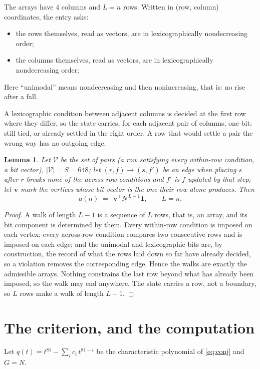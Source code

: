 \documentclass[11pt,a4paper]{article}
\theoremstyle{plain}
\newtheorem{lemma}[theorem]{Lemma}
\theoremstyle{definition}
\begin{document}
The arrays have $4$ columns and $L=n$ rows. Written in (row, column)
coordinates, the entry asks:
\begin{itemize}
\item the rows themselves, read as vectors, are in lexicographically nondecreasing order;
\item the columns themselves, read as vectors, are in lexicographically nondecreasing order;
\end{itemize}
Here ``unimodal'' means nondecreasing and then nonincreasing, that is: no rise after a fall.

A lexicographic condition between adjacent columns is decided
at the first row where they differ, so the state carries, for each adjacent pair of
columns, one bit: still tied, or already settled in the right order. A row that would
settle a pair the wrong way has no outgoing edge.

\begin{lemma}\label{lem:walk}
Let $\mathcal V$ be the set of pairs (a row satisfying every within-row condition, a
bit vector), $|\mathcal V|=S=648$; let $(r,f)\to(s,f')$ be an edge when placing $s$ after $r$
breaks none of the across-row conditions and $f'$ is $f$ updated by that step; let
$\mathbf{v}$ mark the vertices whose bit vector is the one their row alone produces.
Then
\[
a(n)\;=\;\,\mathbf{v}^{\!\top}N^{\,L-1}\mathbf{1},\qquad L=n.
\]
\end{lemma}

\begin{proof}
A walk of length $L-1$ is a sequence of $L$ rows, that is, an array, and its bit component
is determined by them. Every within-row condition is imposed on each vertex; every
across-row condition compares two consecutive rows and is imposed on each edge; and the
unimodal and lexicographic bits are, by construction, the record of what the rows laid down
so far have already decided, so a violation removes the corresponding edge. Hence the walks
are exactly the admissible arrays. Nothing constrains the last row beyond what has already
been imposed, so the walk may end anywhere. The state carries a row, not a boundary, so
$L$ rows make a walk of length $L-1$.
\end{proof}

\section{The criterion, and the computation}

Let $q(t)=t^{81}-\sum_i c_i\,t^{81-i}$ be the characteristic polynomial of
\eqref{eq:conj} and $G=N$.
\end{document}
